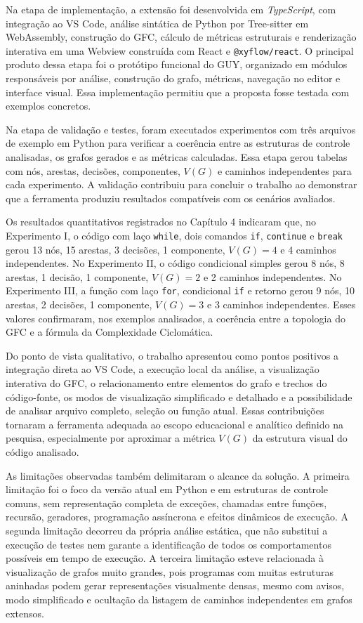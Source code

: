 Na etapa de implementação, a extensão foi desenvolvida em \textit{TypeScript}, com integração ao VS Code, análise sintática de Python por Tree-sitter em WebAssembly, construção do GFC, cálculo de métricas estruturais e renderização interativa em uma Webview construída com React e \texttt{@xyflow/react}. O principal produto dessa etapa foi o protótipo funcional do GUY, organizado em módulos responsáveis por análise, construção do grafo, métricas, navegação no editor e interface visual. Essa implementação permitiu que a proposta fosse testada com exemplos concretos.

Na etapa de validação e testes, foram executados experimentos com três arquivos de exemplo em Python para verificar a coerência entre as estruturas de controle analisadas, os grafos gerados e as métricas calculadas. Essa etapa gerou tabelas com nós, arestas, decisões, componentes, \(V(G)\) e caminhos independentes para cada experimento. A validação contribuiu para concluir o trabalho ao demonstrar que a ferramenta produziu resultados compatíveis com os cenários avaliados.

Os resultados quantitativos registrados no Capítulo 4 indicaram que, no Experimento I, o código com laço \texttt{while}, dois comandos \texttt{if}, \texttt{continue} e \texttt{break} gerou 13 nós, 15 arestas, 3 decisões, 1 componente, \(V(G)=4\) e 4 caminhos independentes. No Experimento II, o código condicional simples gerou 8 nós, 8 arestas, 1 decisão, 1 componente, \(V(G)=2\) e 2 caminhos independentes. No Experimento III, a função com laço \texttt{for}, condicional \texttt{if} e retorno gerou 9 nós, 10 arestas, 2 decisões, 1 componente, \(V(G)=3\) e 3 caminhos independentes. Esses valores confirmaram, nos exemplos analisados, a coerência entre a topologia do GFC e a fórmula da Complexidade Ciclomática.

Do ponto de vista qualitativo, o trabalho apresentou como pontos positivos a integração direta ao VS Code, a execução local da análise, a visualização interativa do GFC, o relacionamento entre elementos do grafo e trechos do código-fonte, os modos de visualização simplificado e detalhado e a possibilidade de analisar arquivo completo, seleção ou função atual. Essas contribuições tornaram a ferramenta adequada ao escopo educacional e analítico definido na pesquisa, especialmente por aproximar a métrica \(V(G)\) da estrutura visual do código analisado.

As limitações observadas também delimitaram o alcance da solução. A primeira limitação foi o foco da versão atual em Python e em estruturas de controle comuns, sem representação completa de exceções, chamadas entre funções, recursão, geradores, programação assíncrona e efeitos dinâmicos de execução. A segunda limitação decorreu da própria análise estática, que não substitui a execução de testes nem garante a identificação de todos os comportamentos possíveis em tempo de execução. A terceira limitação esteve relacionada à visualização de grafos muito grandes, pois programas com muitas estruturas aninhadas podem gerar representações visualmente densas, mesmo com avisos, modo simplificado e ocultação da listagem de caminhos independentes em grafos extensos.

